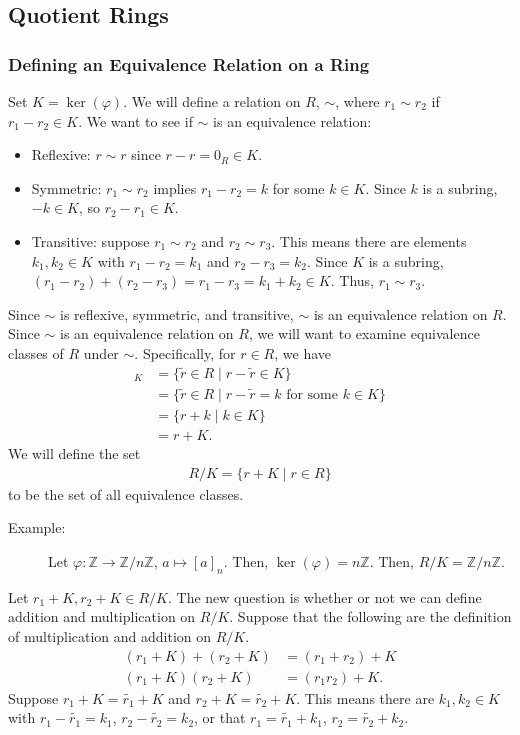 \documentclass[8pt]{extarticle}
\newcommand{\Z}{\mathbb{Z}}
\begin{document}
  \subsection{Quotient Rings}%
  \subsubsection{Defining an Equivalence Relation on a Ring}%
  Set $K = \ker(\varphi)$. We will define a relation on $R$, $\sim$, where $r_1 \sim r_2$ if $r_1-r_2\in K$. We want to see if $\sim$ is an equivalence relation:
  \begin{itemize}
    \item Reflexive: $r\sim r$ since $r-r=0_R \in K$.
    \item Symmetric: $r_1\sim r_2$ implies $r_1 - r_2 = k$ for some $k\in K$. Since $k$ is a subring, $-k\in K$, so $r_2 - r_1\in K$.
    \item Transitive: suppose $r_1 \sim r_2$ and $r_2\sim r_3$. This means there are elements $k_1,k_2\in K$ with $r_1-r_2 = k_1$ and $r_2-r_3 = k_2$. Since $K$ is a subring, $(r_1 - r_2) + (r_2 - r_3) = r_1 - r_3 = k_1 + k_2\in K$. Thus, $r_1 \sim r_3$.
  \end{itemize}
  Since $\sim$ is reflexive, symmetric, and transitive, $\sim$ is an equivalence relation on $R$.\\
  
  Since $\sim$ is an equivalence relation on $R$, we will want to examine equivalence classes of $R$ under $\sim$. Specifically, for $r\in R$, we have
  \begin{align*}
    [r]_K &= \{\tilde{r}\in R \mid r-\tilde{r}\in K\}\\
          &= \{\tilde{r}\in R \mid r - \tilde{r} = k\text{ for some }k\in K\}\\
          &= \{r + k\mid k\in K\}\\
          &= r+K.
  \end{align*}
  We will define the set
  \begin{align*}
    R/K = \{r + K\mid r\in R\}
  \end{align*}
  to be the set of all equivalence classes.
  \begin{description}
    \item[Example:] Let $\varphi: \Z\rightarrow \Z/n\Z$, $a\mapsto [a]_n$. Then, $\ker(\varphi) = n\Z$. Then, $R/K = \Z/n\Z$.
  \end{description}
  Let $r_1 + K,r_2+K\in R/K$. The new question is whether or not we can define addition and multiplication on $R/K$. Suppose that the following are the definition of multiplication and addition on $R/K$.
  \begin{align*}
    (r_1 + K) + (r_2 + K) &= (r_1 + r_2) + K\\
    (r_1 + K)(r_2 + K) &= (r_1r_2) + K.
  \end{align*}
  Suppose $r_1 + K = \tilde{r_1} + K$ and $r_2 + K = \tilde{r_2} + K$. This means there are $k_1,k_2\in K$ with $r_1 - \tilde{r_1} = k_1$, $r_2 - \tilde{r_2} = k_2$, or that $r_1 = \tilde{r_1} + k_1$, $r_2 = \tilde{r_2} + k_2$.\\
\end{document}
